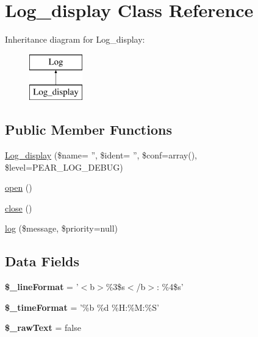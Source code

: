 \hypertarget{class_log__display}{
\section{Log\_\-display Class Reference}
\label{class_log__display}
}
Inheritance diagram for Log\_\-display:\begin{figure}[H]
\begin{center}
\leavevmode
\includegraphics[height=2.000000cm]{class_log__display}
\end{center}
\end{figure}
\subsection*{Public Member Functions}
\begin{DoxyCompactItemize}
\item 
\hyperlink{class_log__display_ad25e02846e6eeb2f8d4592f9d79f5d03}{Log\_\-display} (\$name= '', \$ident= '', \$conf=array(), \$level=PEAR\_\-LOG\_\-DEBUG)
\item 
\hyperlink{class_log__display_a44a2ac59a3b91f8c18905dce700934d6}{open} ()
\item 
\hyperlink{class_log__display_aa69c8bf1f1dcf4e72552efff1fe3e87e}{close} ()
\item 
\hyperlink{class_log__display_ac3758dfa38a67df158a446847cf06413}{log} (\$message, \$priority=null)
\end{DoxyCompactItemize}
\subsection*{Data Fields}
\begin{DoxyCompactItemize}
\item 
\hypertarget{class_log__display_a987ec493419026385e852e1fbbc68543}{
{\bfseries \$\_\-lineFormat} = '$<$b$>$\%3\$s$<$/b$>$: \%4\$s'}
\label{class_log__display_a987ec493419026385e852e1fbbc68543}

\item 
\hypertarget{class_log__display_a7b5dae11e5c85b90db946240cb9d4e42}{
{\bfseries \$\_\-timeFormat} = '\%b \%d \%H:\%M:\%S'}
\label{class_log__display_a7b5dae11e5c85b90db946240cb9d4e42}

\item 
\hypertarget{class_log__display_a71a796528e37593c1ced9208dc114240}{
{\bfseries \$\_\-rawText} = false}
\label{class_log__display_a71a796528e37593c1ced9208dc114240}

\end{DoxyCompactItemize}


